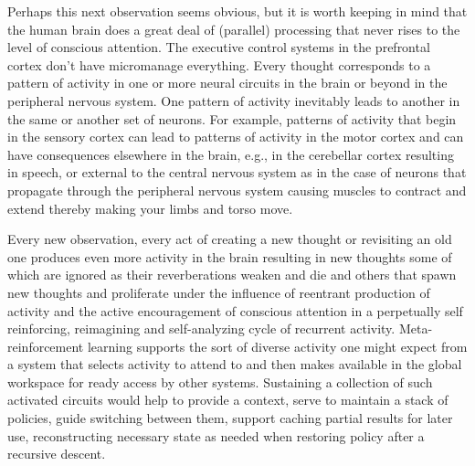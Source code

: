 Perhaps this next observation seems obvious, but it is worth keeping in mind that the human brain does a great deal of (parallel) processing that never rises to the level of conscious attention. The executive control systems in the prefrontal cortex don't have micromanage everything. Every thought corresponds to a pattern of activity in one or more neural circuits in the brain or beyond in the peripheral nervous system. One pattern of activity inevitably leads to another in the same or another set of neurons. For example, patterns of activity that begin in the sensory cortex can lead to patterns of activity in the motor cortex and can have consequences elsewhere in the brain, e.g., in the cerebellar cortex resulting in speech, or external to the central nervous system as in the case of neurons that propagate through the peripheral nervous system causing muscles to contract and extend thereby making your limbs and torso move. 

Every new observation, every act of creating a new thought or revisiting an old one produces even more activity in the brain resulting in new thoughts some of which are ignored as their reverberations weaken and die and others that spawn new thoughts and proliferate under the influence of reentrant production of activity and the active encouragement of conscious attention in a perpetually self reinforcing, reimagining and self-analyzing cycle of recurrent activity. Meta-reinforcement learning supports the sort of diverse activity one might expect from a system that selects activity to attend to and then makes available in the global workspace for ready access by other systems. Sustaining a collection of such activated circuits would help to provide a context, serve to maintain a stack of policies, guide switching between them, support caching partial results for later use, reconstructing necessary state as needed when restoring policy after a recursive descent.

